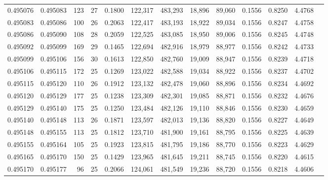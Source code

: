 \begin{tabular}{rrrrrrrrrrrrr}
0.495076 & 0.495083 & 123 &  27 &                                     0.1800 & 122,317 & 483,293 &  18,896 &  89,060 & 0.1556 & 0.8250 & 4.4768 \\
0.495083 & 0.495086 & 100 &  26 &                                     0.2063 & 122,417 & 483,193 &  18,922 &  89,034 & 0.1556 & 0.8247 & 4.4758 \\
0.495086 & 0.495090 & 108 &  28 &                                     0.2059 & 122,525 & 483,085 &  18,950 &  89,006 & 0.1556 & 0.8245 & 4.4748 \\
0.495092 & 0.495099 & 169 &  29 &                                     0.1465 & 122,694 & 482,916 &  18,979 &  88,977 & 0.1556 & 0.8242 & 4.4733 \\
0.495099 & 0.495106 & 156 &  30 &                                     0.1613 & 122,850 & 482,760 &  19,009 &  88,947 & 0.1556 & 0.8239 & 4.4718 \\
0.495106 & 0.495115 & 172 &  25 &                                     0.1269 & 123,022 & 482,588 &  19,034 &  88,922 & 0.1556 & 0.8237 & 4.4702 \\
0.495115 & 0.495120 & 110 &  26 &                                     0.1912 & 123,132 & 482,478 &  19,060 &  88,896 & 0.1556 & 0.8234 & 4.4692 \\
0.495120 & 0.495129 & 177 &  25 &                                     0.1238 & 123,309 & 482,301 &  19,085 &  88,871 & 0.1556 & 0.8232 & 4.4676 \\
0.495129 & 0.495140 & 175 &  25 &                                     0.1250 & 123,484 & 482,126 &  19,110 &  88,846 & 0.1556 & 0.8230 & 4.4659 \\
0.495140 & 0.495148 & 113 &  26 &                                     0.1871 & 123,597 & 482,013 &  19,136 &  88,820 & 0.1556 & 0.8227 & 4.4649 \\
0.495148 & 0.495155 & 113 &  25 &                                     0.1812 & 123,710 & 481,900 &  19,161 &  88,795 & 0.1556 & 0.8225 & 4.4639 \\
0.495155 & 0.495164 & 105 &  25 &                                     0.1923 & 123,815 & 481,795 &  19,186 &  88,770 & 0.1556 & 0.8223 & 4.4629 \\
0.495165 & 0.495170 & 150 &  25 &                                     0.1429 & 123,965 & 481,645 &  19,211 &  88,745 & 0.1556 & 0.8220 & 4.4615 \\
0.495170 & 0.495177 &  96 &  25 &                                     0.2066 & 124,061 & 481,549 &  19,236 &  88,720 & 0.1556 & 0.8218 & 4.4606 \\

\end{tabular}
